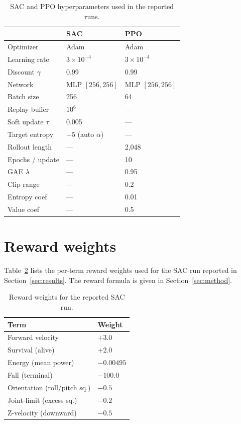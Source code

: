 \documentclass[sigconf,nonacm]{acmart}
\begin{document}
\begin{table}[!htbp]
\caption{SAC and PPO hyperparameters used in the reported runs.}
\label{tab:hparams}
\begin{tabular}{lll}
\toprule
                 & SAC                   & PPO \\
\midrule
Optimizer        & Adam                  & Adam \\
Learning rate    & $3\times10^{-4}$      & $3\times10^{-4}$ \\
Discount $\gamma$ & 0.99                 & 0.99 \\
Network          & MLP $[256,256]$       & MLP $[256,256]$ \\
Batch size       & 256                   & 64 \\
Replay buffer    & $10^6$                & --- \\
Soft update $\tau$ & 0.005               & --- \\
Target entropy   & $-5$ (auto $\alpha$)  & --- \\
Rollout length   & ---                   & 2{,}048 \\
Epochs / update  & ---                   & 10 \\
GAE $\lambda$    & ---                   & 0.95 \\
Clip range       & ---                   & 0.2 \\
Entropy coef     & ---                   & 0.01 \\
Value coef       & ---                   & 0.5 \\
\bottomrule
\end{tabular}
\end{table}

\section{Reward weights}
Table~\ref{tab:rewards} lists the per-term reward weights used for the SAC run
reported in Section~\ref{sec:results}. The reward formula is given in
Section~\ref{sec:method}.

\begin{table}[!htbp]
\caption{Reward weights for the reported SAC run.}
\label{tab:rewards}
\begin{tabular}{ll}
\toprule
Term                  & Weight \\
\midrule
Forward velocity      & $+3.0$ \\
Survival (alive)      & $+2.0$ \\
Energy (mean power)   & $-0.00495$ \\
Fall (terminal)       & $-100.0$ \\
Orientation (roll/pitch sq.) & $-0.5$ \\
Joint-limit (excess sq.)     & $-0.2$ \\
Z-velocity (downward) & $-0.5$ \\
\bottomrule
\end{tabular}
\end{table}
\end{document}
